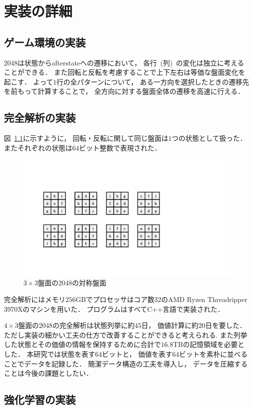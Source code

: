 \chapter{実装の詳細}

\section{ゲーム環境の実装}
\label{sec:game_impl}
2048は状態からafterstateへの遷移において， 各行~(列)~の変化は独立に考えることができる．
また回転と反転を考慮することで上下左右は等価な盤面変化を起こす．
よって$1$行の全パターンについて， ある一方向を選択したときの遷移先を前もって計算することで， 全方向に対する盤面全体の遷移を高速に行える．

\section{完全解析の実装}
図~\ref{fig:symmtric_boards}に示すように， 回転・反転に関して同じ盤面は$1$つの状態として扱った．
またそれぞれの状態は$64$ビット整数で表現された．
\begin{figure}[t]
    \centering
    \includegraphics[width=0.6\linewidth{}]{figures/symmetric.pdf}
    \caption{$3\times3$盤面の2048の対称盤面}
    \label{fig:symmtric_boards}
\end{figure}
完全解析にはメモリ$256$GBでプロセッサはコア数$32$のAMD Ryzen Threadripper 3970Xのマシンを用いた．
プログラムはすべてC++言語で実装された．

$4\times3$盤面の2048の完全解析は状態列挙に約$45$日， 価値計算に約$20$日を要した．
ただし実装の細かい工夫の仕方で改善することができると考えられる.
また列挙した状態とその価値の情報を保持するために合計で$16.8$TBの記憶領域を必要とした．
本研究では状態を表す$64$ビットと， 価値を表す$64$ビットを素朴に並べることでデータを記録した．
簡潔データ構造の工夫を導入し， データを圧縮することは今後の課題としたい．

\section{強化学習の実装}
